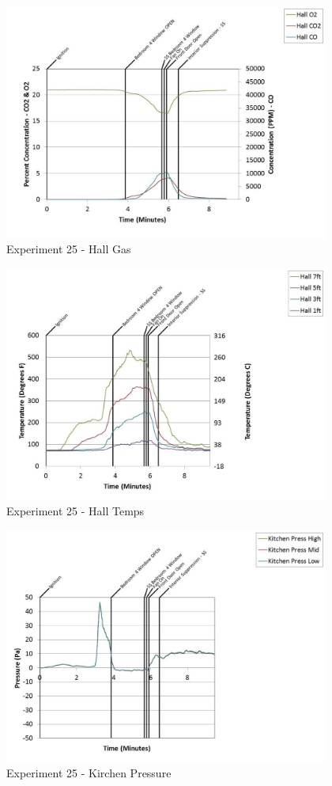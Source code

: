 \documentclass{article}
\begin{document}
\begin{appendices}
	\begin{figure}[h!]
		\centering
		\includegraphics[height=3.05in]{0_Images/Results_Charts/Exp_25_Charts/HallGas.pdf}
		\caption{Experiment 25 - Hall Gas}
	\end{figure}
 
	\clearpage

	\begin{figure}[h!]
		\centering
		\includegraphics[height=3.05in]{0_Images/Results_Charts/Exp_25_Charts/HallTemps.pdf}
		\caption{Experiment 25 - Hall Temps}
	\end{figure}
 

	\begin{figure}[h!]
		\centering
		\includegraphics[height=3.05in]{0_Images/Results_Charts/Exp_25_Charts/KirchenPressure.pdf}
		\caption{Experiment 25 - Kirchen Pressure}
	\end{figure}
 

\end{appendices}
\end{document}
